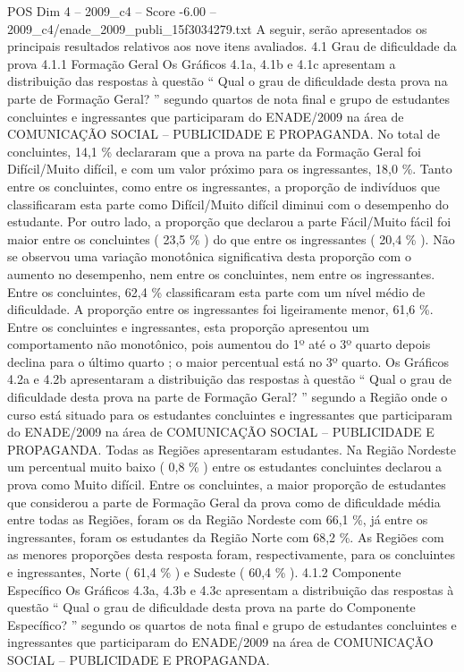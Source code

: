 \begin{textsample}{POS Dim 4 – 2009\_c4 – Score -6.00 – 2009\_c4/enade\_2009\_publi\_15f3034279.txt}
A seguir, serão apresentados os principais resultados relativos aos nove itens avaliados. 4.1 Grau de dificuldade da prova 4.1.1 Formação Geral Os Gráficos 4.1a, 4.1b e 4.1c apresentam a distribuição das respostas à questão “ Qual o grau de dificuldade desta prova na parte de Formação Geral? ” segundo quartos de nota final e grupo de estudantes concluintes e ingressantes que participaram do ENADE/2009 na área de COMUNICAÇÃO SOCIAL – PUBLICIDADE E PROPAGANDA.
No total de concluintes, 14,1 \% declararam que a prova na parte da Formação Geral foi Difícil/Muito difícil, e com um valor próximo para os ingressantes, 18,0 \%.
Tanto entre os concluintes, como entre os ingressantes, a proporção de indivíduos que classificaram esta parte como Difícil/Muito difícil diminui com o desempenho do estudante.
Por outro lado, a proporção que declarou a parte Fácil/Muito fácil foi maior entre os concluintes ( 23,5 \% ) do que entre os ingressantes ( 20,4 \% ).
Não se observou uma variação monotônica significativa desta proporção com o aumento no desempenho, nem entre os concluintes, nem entre os ingressantes.
Entre os concluintes, 62,4 \% classificaram esta parte com um nível médio de dificuldade.
A proporção entre os ingressantes foi ligeiramente menor, 61,6 \%.
Entre os concluintes e ingressantes, esta proporção apresentou um comportamento não monotônico, pois aumentou do 1º até o 3º quarto depois declina para o último quarto ; o maior percentual está no 3º quarto.
Os Gráficos 4.2a e 4.2b apresentaram a distribuição das respostas à questão “ Qual o grau de dificuldade desta prova na parte de Formação Geral? ” segundo a Região onde o curso está situado para os estudantes concluintes e ingressantes que participaram do ENADE/2009 na área de COMUNICAÇÃO SOCIAL – PUBLICIDADE E PROPAGANDA.
Todas as Regiões apresentaram estudantes.
Na Região Nordeste um percentual muito baixo ( 0,8 \% ) entre os estudantes concluintes declarou a prova como Muito difícil.
Entre os concluintes, a maior proporção de estudantes que considerou a parte de Formação Geral da prova como de dificuldade média entre todas as Regiões, foram os da Região Nordeste com 66,1 \%, já entre os ingressantes, foram os estudantes da Região Norte com 68,2 \%.
As Regiões com as menores proporções desta resposta foram, respectivamente, para os concluintes e ingressantes, Norte ( 61,4 \% ) e Sudeste ( 60,4 \% ). 4.1.2 Componente Específico Os Gráficos 4.3a, 4.3b e 4.3c apresentam a distribuição das respostas à questão “ Qual o grau de dificuldade desta prova na parte do Componente Específico? ” segundo os quartos de nota final e grupo de estudantes concluintes e ingressantes que participaram do ENADE/2009 na área de COMUNICAÇÃO SOCIAL – PUBLICIDADE E PROPAGANDA.

\end{textsample}
